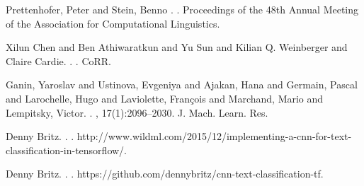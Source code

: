 \documentclass[11pt,a4paper]{article}
\begin{document}
%
%

\begin{thebibliography}{}
Prettenhofer, Peter and Stein, Benno
.
.
\newblock Proceedings of the 48th Annual Meeting of the Association for Computational Linguistics.

Xilun Chen and Ben Athiwaratkun and Yu Sun and Kilian Q. Weinberger and Claire Cardie.
.
.
\newblock CoRR.

Ganin, Yaroslav and Ustinova, Evgeniya and Ajakan, Hana and Germain, Pascal and Larochelle, Hugo and Laviolette, Fran\c{c}ois and Marchand, Mario and Lempitsky, Victor.
.
,
  17(1):2096--2030.
\newblock J. Mach. Learn. Res.

Denny Britz.
.
.
\newblock http://www.wildml.com/2015/12/implementing-a-cnn-for-text-classification-in-tensorflow/.

Denny Britz.
.
.
\newblock https://github.com/dennybritz/cnn-text-classification-tf.


\end{thebibliography}
\end{document}
